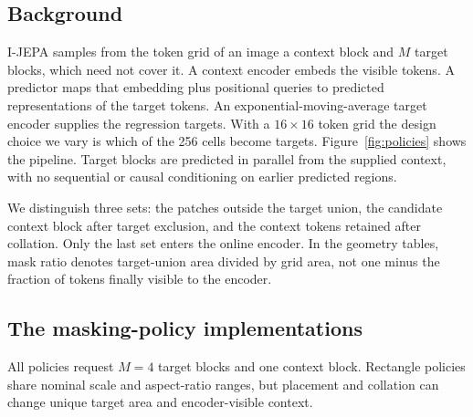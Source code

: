 \documentclass{article}
\begin{document}
\subsection{Background}

I-JEPA samples from the token grid of an image a context block and $M$ target
blocks, which need not cover it. A context encoder embeds the visible tokens. A predictor maps that
embedding plus positional queries to predicted representations of the target
tokens. An exponential-moving-average target encoder supplies the regression
targets. With a $16{\times}16$ token grid the design choice we vary is which of
the 256 cells become targets. Figure~\ref{fig:policies} shows the pipeline.
Target blocks are predicted in parallel from the supplied context, with no
sequential or causal conditioning on earlier predicted regions.

We distinguish three sets: the patches outside the target union, the candidate
context block after target exclusion, and the context tokens retained after
collation. Only the last set enters the online encoder. In the geometry tables,
mask ratio denotes target-union area divided by grid area, not one minus the
fraction of tokens finally visible to the encoder.

\subsection{The masking-policy implementations}

All policies request $M{=}4$ target blocks and one context block. Rectangle
policies share nominal scale and aspect-ratio ranges, but placement and
collation can change unique target area and encoder-visible context.
\end{document}
